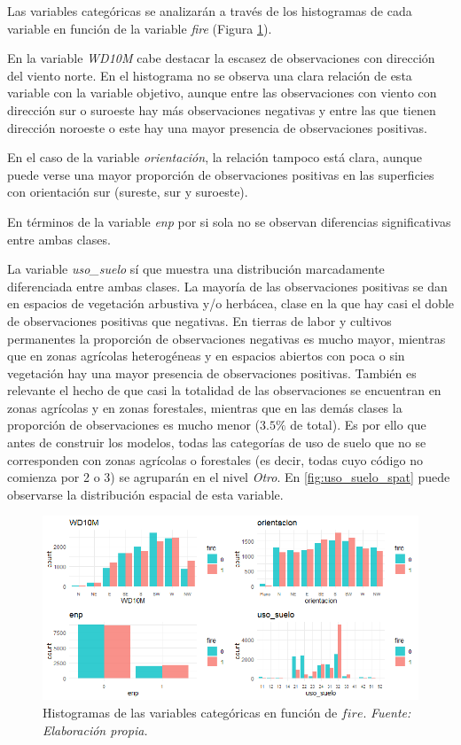 \documentclass[12pt,a4paper,]{book}
\numberwithin{dummy}{section}
\theoremstyle{ocrenumbox}
\theoremstyle{blacknumex}
\theoremstyle{blacknumbox}
\theoremstyle{ocrenum}
\theoremstyle{ocrenum}
\begin{document}
Las variables categóricas se analizarán a través de los histogramas de
cada variable en función de la variable \emph{fire} (Figura
\ref{fig:histogramas}).

En la variable \emph{WD10M} cabe destacar la escasez de observaciones
con dirección del viento norte. En el histograma no se observa una clara
relación de esta variable con la variable objetivo, aunque entre las
observaciones con viento con dirección sur o suroeste hay más
observaciones negativas y entre las que tienen dirección noroeste o este
hay una mayor presencia de observaciones positivas.

En el caso de la variable \emph{orientación}, la relación tampoco está
clara, aunque puede verse una mayor proporción de observaciones
positivas en las superficies con orientación sur (sureste, sur y
suroeste).

En términos de la variable \emph{enp} por si sola no se observan
diferencias significativas entre ambas clases.

La variable \emph{uso\_suelo} sí que muestra una distribución
marcadamente diferenciada entre ambas clases. La mayoría de las
observaciones positivas se dan en espacios de vegetación arbustiva y/o
herbácea, clase en la que hay casi el doble de observaciones positivas
que negativas. En tierras de labor y cultivos permanentes la proporción
de observaciones negativas es mucho mayor, mientras que en zonas
agrícolas heterogéneas y en espacios abiertos con poca o sin vegetación
hay una mayor presencia de observaciones positivas. También es relevante
el hecho de que casi la totalidad de las observaciones se encuentran en
zonas agrícolas y en zonas forestales, mientras que en las demás clases
la proporción de observaciones es mucho menor (\(3.5\%\) de total). Es
por ello que antes de construir los modelos, todas las categorías de uso
de suelo que no se corresponden con zonas agrícolas o forestales (es
decir, todas cuyo código no comienza por 2 o 3) se agruparán en el nivel
\emph{Otro}. En \ref{fig:uso_suelo_spat} puede observarse la
distribución espacial de esta variable.

\begin{figure}[h]
\centering
\includegraphics[width =\textwidth]{graficos/histogramas.png}
\caption{Histogramas de las variables categóricas en función de $fire$. \it Fuente: Elaboración propia.}
\label{fig:histogramas}
\end{figure}
\end{document}
